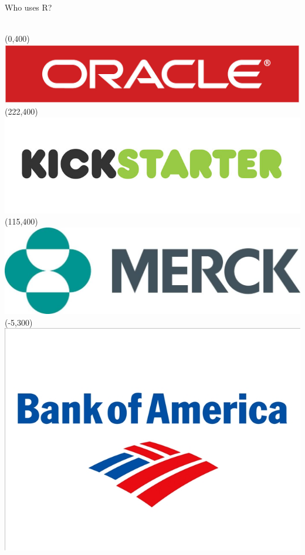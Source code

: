 \begin{frame}
\vspace{-.1cm}
\begin{block}{Who uses R?}
\ \\[6.5cm]\ 
\end{block}
\Put(0,400){\includegraphics[scale=1]{../common/pics/logos/oracle}}
\Put(222,400){\includegraphics[scale=.12]{../common/pics/logos/kickstarter}}
\Put(115,400){\includegraphics[scale=.1]{../common/pics/logos/merck}}
\Put(-5,300){\includegraphics[scale=.2]{../common/pics/logos/boa}}

\end{frame}
